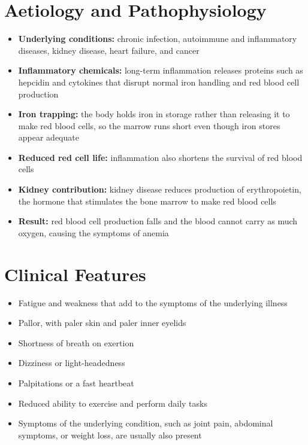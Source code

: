 \section*{Aetiology and Pathophysiology}
\begin{itemize}
    \item \textbf{Underlying conditions:} chronic infection, autoimmune and inflammatory diseases, kidney disease, heart failure, and cancer
    \item \textbf{Inflammatory chemicals:} long-term inflammation releases proteins such as hepcidin and cytokines that disrupt normal iron handling and red blood cell production
    \item \textbf{Iron trapping:} the body holds iron in storage rather than releasing it to make red blood cells, so the marrow runs short even though iron stores appear adequate
    \item \textbf{Reduced red cell life:} inflammation also shortens the survival of red blood cells
    \item \textbf{Kidney contribution:} kidney disease reduces production of erythropoietin, the hormone that stimulates the bone marrow to make red blood cells
    \item \textbf{Result:} red blood cell production falls and the blood cannot carry as much oxygen, causing the symptoms of anemia
\end{itemize}

\section*{Clinical Features}
\begin{itemize}
    \item Fatigue and weakness that add to the symptoms of the underlying illness
    \item Pallor, with paler skin and paler inner eyelids
    \item Shortness of breath on exertion
    \item Dizziness or light-headedness
    \item Palpitations or a fast heartbeat
    \item Reduced ability to exercise and perform daily tasks
    \item Symptoms of the underlying condition, such as joint pain, abdominal symptoms, or weight loss, are usually also present
\end{itemize}

